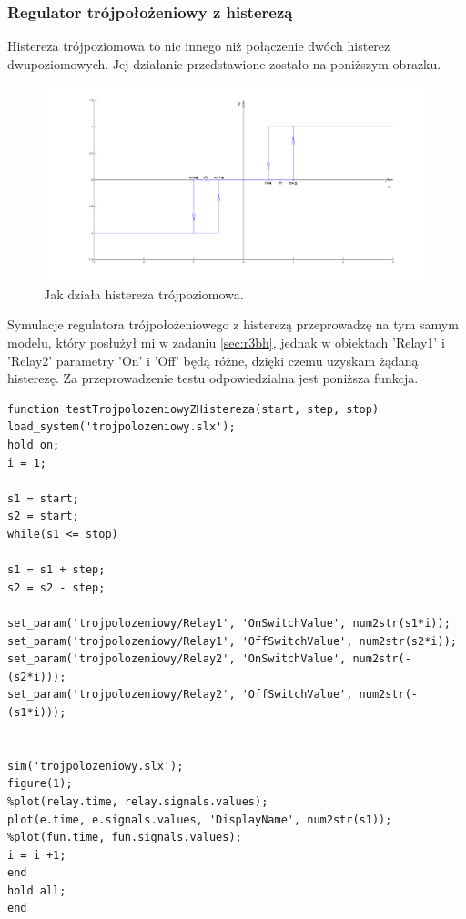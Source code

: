 \documentclass[a4paper,10pt]{article}
\begin{document}
\subsubsection{Regulator trójpołożeniowy z histerezą}\label{sec:r3h}

Histereza trójpoziomowa to nic innego niż połączenie dwóch histerez dwupoziomowych. Jej działanie przedstawione zostało na poniższym obrazku.

\begin{figure}[!h]
    \centering
	\includegraphics[width=120mm]{CW3-histereza-trojpoziomowa.png}
	\caption{Jak działa histereza trójpoziomowa.}
    \label{fig:Rysunek}
\end{figure}

Symulacje regulatora trójpołożeniowego z histerezą przeprowadzę na tym samym modelu, który posłużył mi w zadaniu \ref{sec:r3bh}, jednak w obiektach 'Relay1' i 'Relay2' parametry 'On' i 'Off' będą różne, dzięki czemu uzyskam żądaną histerezę.
Za przeprowadzenie testu odpowiedzialna jest poniższa funkcja.

\begin{lstlisting}[caption=Funkcja testująca regulator trójpołożeniowy z histerezą.]
function testTrojpolozeniowyZHistereza(start, step, stop)
load_system('trojpolozeniowy.slx');
hold on;
i = 1;

s1 = start;
s2 = start;
while(s1 <= stop)

s1 = s1 + step;
s2 = s2 - step;

set_param('trojpolozeniowy/Relay1', 'OnSwitchValue', num2str(s1*i));
set_param('trojpolozeniowy/Relay1', 'OffSwitchValue', num2str(s2*i));
set_param('trojpolozeniowy/Relay2', 'OnSwitchValue', num2str(-(s2*i)));
set_param('trojpolozeniowy/Relay2', 'OffSwitchValue', num2str(-(s1*i)));


sim('trojpolozeniowy.slx');
figure(1);
%plot(relay.time, relay.signals.values);
plot(e.time, e.signals.values, 'DisplayName', num2str(s1));
%plot(fun.time, fun.signals.values);
i = i +1;
end
hold all;
end
\end{lstlisting}
\end{document}
